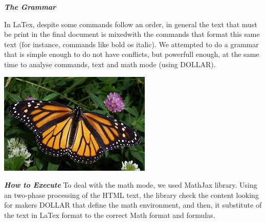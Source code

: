 \documentclass{article}
\begin{document}
\textit{\textbf{The Grammar}}

In LaTex, despite some commands follow an order, in general the text that must be print in the final document is mixedwith the commands that format this same text (for instance, commands like bold os italic). We attempted to do a grammar that is simple enough to do not have conflicts, but powerfull enough, at the same time to analyse commands, text and math mode (using DOLLAR).

\includegraphics{monarch.jpg}

\textit{\textbf{How to Execute}}
To deal with the math mode, we used MathJax library. Using an two-phase processing of the HTML text, the library check the content looking for makers DOLLAR that define the math environment, and then, it substitute of the text in LaTex format to the correct Math format and formulas.
\end{document}
